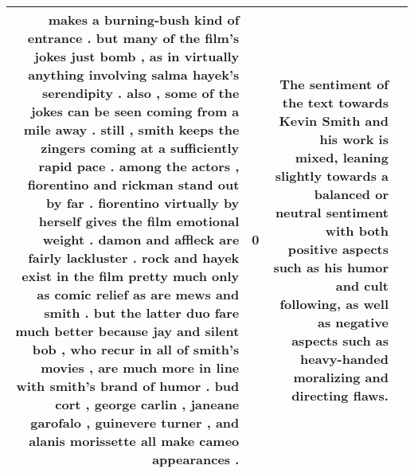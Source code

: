 \begin{tabular}{r{1cm} p{0.4in} r{1cm} p{0.4in}}
makes a burning-bush kind of entrance .  but many of the film's jokes just bomb , as in virtually anything involving salma hayek's serendipity .  also , some of the jokes can be seen coming from a mile away .  still , smith keeps the zingers coming at a sufficiently rapid pace .  among the actors , fiorentino and rickman stand out by far .  fiorentino virtually by herself gives the film emotional weight .  damon and affleck are fairly lackluster .  rock and hayek exist in the film pretty much only as comic relief as are mews and smith .  but the latter duo fare much better because jay and silent bob , who recur in all of smith's movies , are much more in line with smith's brand of humor .  bud cort , george carlin , janeane garofalo , guinevere turner , and alanis morissette all make cameo appearances .   & 0 & The sentiment of the text towards Kevin Smith and his work is mixed, leaning slightly towards a balanced or neutral sentiment with both positive aspects such as his humor and cult following, as well as negative aspects such as heavy-handed moralizing and directing flaws. \\
\bottomrule
\end{tabular}
